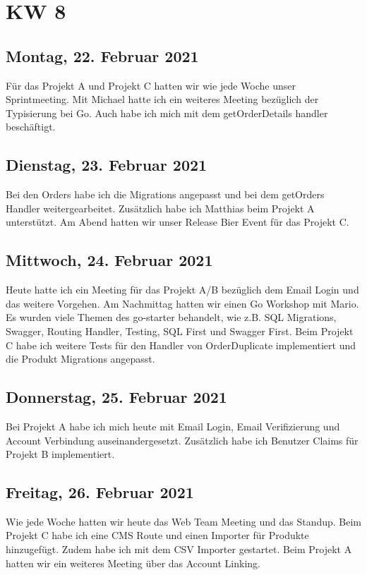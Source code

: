 \chapter{KW 8}

\section{Montag, 22. Februar 2021}
Für das Projekt A und Projekt C hatten wir wie jede Woche unser Sprintmeeting. Mit Michael hatte ich ein weiteres Meeting bezüglich der Typisierung bei Go. Auch habe ich mich mit dem getOrderDetails handler beschäftigt.

\section{Dienstag, 23. Februar 2021}
Bei den Orders habe ich die Migrations angepasst und bei dem getOrders Handler weitergearbeitet. Zusätzlich habe ich Matthias beim Projekt A unterstützt. Am Abend hatten wir unser Release Bier Event für das Projekt C.

\section{Mittwoch, 24. Februar 2021}
Heute hatte ich ein Meeting für das Projekt A/B bezüglich dem Email Login und das weitere Vorgehen. Am Nachmittag hatten wir einen Go Workshop mit Mario. Es wurden viele Themen des go-starter\cite{gostarter} behandelt, wie z.B. SQL Migrations, Swagger, Routing Handler, Testing, SQL First und Swagger First. Beim Projekt C habe ich weitere Tests für den Handler von OrderDuplicate implementiert und die Produkt Migrations angepasst.

\section{Donnerstag, 25. Februar 2021}
Bei Projekt A habe ich mich heute mit Email Login, Email Verifizierung und Account Verbindung auseinandergesetzt. Zusätzlich habe ich Benutzer Claims für Projekt B implementiert.

\section{Freitag, 26. Februar 2021}
Wie jede Woche hatten wir heute das Web Team Meeting und das Standup. Beim Projekt C habe ich eine CMS Route und einen Importer für Produkte hinzugefügt. Zudem habe ich mit dem CSV Importer gestartet. Beim Projekt A hatten wir ein weiteres Meeting über das Account Linking.


